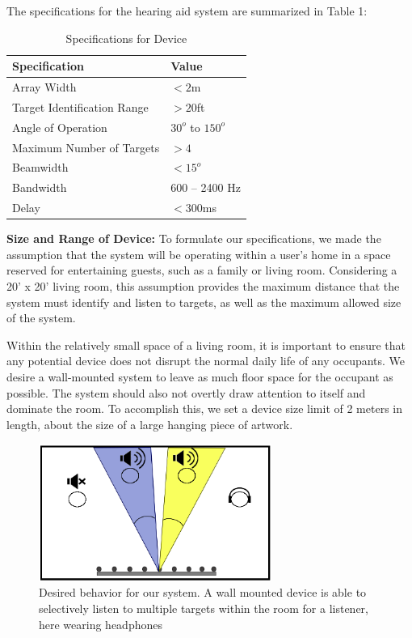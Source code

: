 \documentclass[10pt,journal,compsoc]{IEEEtran}
\begin{document}
The specifications for the hearing aid system are summarized in Table 1: \\

\begin{table}[htb!]
    \centering
    \begin{tabular}{|l|l|}
    \hline
    Specification  & Value  \\
    \hline
    Array Width	& $<2$m \\
    Target Identification Range & $>20$ft \\
    Angle of Operation & $30^o$ to $150^o$ \\
    Maximum Number of Targets &	$>4$ \\
    Beamwidth &	$<15^o$ \\
    Bandwidth &	600 – 2400 Hz\\
    Delay & $<300$ms \\
    \hline
    \end{tabular}
    \caption{Specifications for Device}
    \label{tab:specs}
\end{table}



\textbf{Size and Range of Device:} To formulate our specifications, we made the assumption that the system will be operating within a user’s home in a space reserved for entertaining guests, such as a family or living room. Considering a 20’ x 20’ living room, this assumption provides the maximum distance that the system must identify and listen to targets, as well as the maximum allowed size of the system.

Within the relatively small space of a living room, it is important to ensure that any potential device does not disrupt the normal daily life of any occupants. We desire a wall-mounted system to leave as much floor space for the occupant as possible. The system should also not overtly draw attention to itself and dominate the room. To accomplish this, we set a device size limit of 2 meters in length, about the size of a large hanging piece of artwork.

\begin{figure}
    \centering
    \includegraphics[width=3in]{beams}
    \caption{Desired behavior for our system. A wall mounted device is able to selectively listen to multiple targets within the room for a listener, here wearing headphones}
    \label{fig:beams}
\end{figure}
\end{document}
